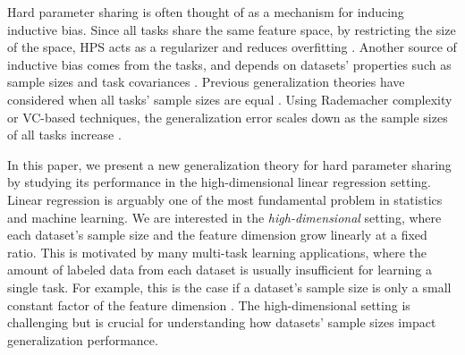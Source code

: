 Hard parameter sharing is often thought of as a mechanism for inducing inductive bias.
Since all tasks share the same feature space, by restricting the size of the space, HPS acts as a regularizer and reduces overfitting \cite{KD12,WZR20}.
Another source of inductive bias comes from the tasks, and depends on datasets' properties such as sample sizes and task covariances \cite{WZR20}.
Previous generalization theories have considered when all tasks' sample sizes are equal \cite{B00,MPR16}.
Using Rademacher complexity or VC-based techniques, the generalization error scales down as the sample sizes of all tasks increase \cite{AZ05,M06}.


In this paper, we present a new generalization theory for hard parameter sharing by studying its  performance in the high-dimensional linear regression setting.
Linear regression is arguably one of the most fundamental problem in statistics and machine learning.
We are interested in the \textit{high-dimensional} setting, where each dataset's sample size and the feature dimension grow linearly at a fixed ratio.
This is motivated by many multi-task learning applications, where the amount of labeled data from each dataset is usually insufficient for learning a single task.
For example, this is the case if a dataset's sample size is only a small constant factor of the feature dimension \cite{socher2013recursive}.
The high-dimensional setting is challenging but is crucial for understanding how datasets' sample sizes impact generalization performance.
